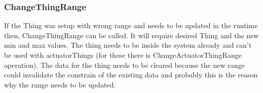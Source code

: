 \documentclass{article}
\newcommand{\same}[1]{\\{#1}'={#1}}
\newcommand{\sameObvious}[1]{\same{rooms}\same{allThings}\same{noiseThings}\same{tempThings}\same{lightThings}\same{actuatorThings}  }
\begin{document}
\newpage
\label{toc:ChangeThingRange}
\subsubsection{ChangeThingRange}
If the Thing was setup with wrong range and needs to be updated in the runtime then, ChangeThingRange can be called. It will require desired Thing and the new min and max values. The thing needs to be inside the system already and can't be used with actuatorThings (for these there is ChangeActuatorThingRange operation). The data for the thing needs to be cleared because the new range could invalidate the constrain of the existing data and probably this is the reason why the range needs to be updated. 

\newpage
\label{toc:ChangeActuatorThingRange}
\end{document}
